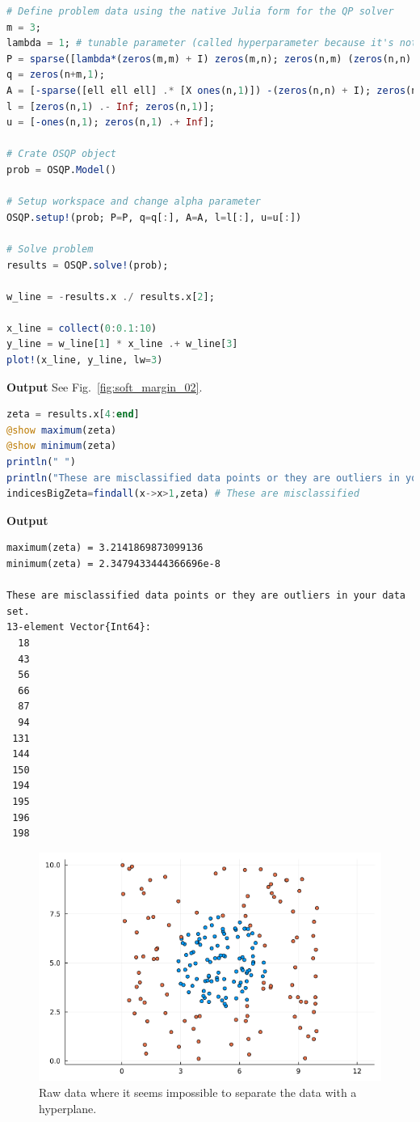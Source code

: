 \begin{lstlisting}[language=Julia,style=mystyle]
# Define problem data using the native Julia form for the QP solver
m = 3;
lambda = 1; # tunable parameter (called hyperparameter because it's not like w the parameter of our model)
P = sparse([lambda*(zeros(m,m) + I) zeros(m,n); zeros(n,m) (zeros(n,n) + I)]);
q = zeros(n+m,1);
A = [-sparse([ell ell ell] .* [X ones(n,1)]) -(zeros(n,n) + I); zeros(n,m) (zeros(n,n) + I)]
l = [zeros(n,1) .- Inf; zeros(n,1)];
u = [-ones(n,1); zeros(n,1) .+ Inf];

# Crate OSQP object
prob = OSQP.Model()

# Setup workspace and change alpha parameter
OSQP.setup!(prob; P=P, q=q[:], A=A, l=l[:], u=u[:])

# Solve problem
results = OSQP.solve!(prob);

w_line = -results.x ./ results.x[2];

x_line = collect(0:0.1:10)
y_line = w_line[1] * x_line .+ w_line[3]
plot!(x_line, y_line, lw=3)

\end{lstlisting}
\textbf{Output} 
See Fig.~\ref{fig:soft_margin_02}.


\begin{lstlisting}[language=Julia,style=mystyle]
zeta = results.x[4:end]
@show maximum(zeta)
@show minimum(zeta)
println(" ")
println("These are misclassified data points or they are outliers in your data set.")
indicesBigZeta=findall(x->x>1,zeta) # These are misclassified 
\end{lstlisting}
\textbf{Output} 
\begin{verbatim}
maximum(zeta) = 3.2141869873099136
minimum(zeta) = 2.3479433444366696e-8
 
These are misclassified data points or they are outliers in your data set.
13-element Vector{Int64}:
  18
  43
  56
  66
  87
  94
 131
 144
 150
 194
 195
 196
 198
\end{verbatim}
\begin{figure}[hb!]%
\centering
\includegraphics[width=0.95\columnwidth]{graphics/Chap13SeparatingHyperplanes/GaussiamSoftMargin01.png}%
\caption[]{Raw data where it seems impossible to separate the data with a hyperplane.}    
\label{fig:Gaussian_soft_margin_01}
\end{figure}

